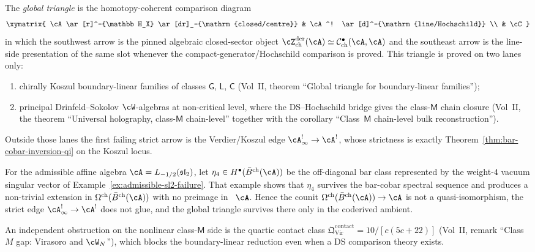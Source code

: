 \begin{remark}
\label{rem:hdm-boundary-linear-vs-global-triangle}
The \emph{global triangle} is the homotopy-coherent comparison diagram
\[
\xymatrix{
\cA \ar[r]^-{\mathbb H_X}
 \ar[dr]_-{\mathrm{closed/centre}}
& \cA^! \ar[d]^-{\mathrm{line/Hochschild}} \\
& \cC
}
\]
in which the southwest arrow is the pinned algebraic closed-sector object
$\cZ^{\mathrm{der}}_{\mathrm{ch}}(\cA)
\simeq \mathcal{C}^{\bullet}_{\mathrm{ch}}(\cA,\cA)$ and the southeast
arrow is the line-side presentation of the same slot whenever the
compact-generator/Hochschild comparison is proved. This triangle is
proved on two lanes only:
\begin{enumerate}[label=\textup{(\roman*)}]
\item chirally Koszul boundary-linear families of classes
 $\mathsf{G}$, $\mathsf{L}$, $\mathsf{C}$
 \textup{(}Vol~II, theorem ``Global triangle for boundary-linear
 families''\textup{)};
\item principal Drinfeld--Sokolov $\cW$-algebras at non-critical level,
 where the DS--Hochschild bridge gives the class-$\mathsf{M}$ chain
 closure
 \textup{(}Vol~II, the theorem ``Universal holography,
 class-$\mathsf{M}$ chain-level'' together with the corollary
 ``Class~$\mathsf{M}$ chain-level bulk reconstruction''\textup{)}.
\end{enumerate}
Outside those lanes the first failing strict arrow is the Verdier/Koszul
edge $\cA^{!}_\infty \to \cA^!$, whose strictness is exactly
Theorem~\ref{thm:bar-cobar-inversion-qi} on the Koszul locus.

For the admissible affine algebra
$\cA = L_{-1/2}(\mathfrak{sl}_2)$, let
$\eta_4 \in H^\bullet(\bar{B}^{\mathrm{ch}}(\cA))$ be the off-diagonal
bar class represented by the weight-$4$ vacuum singular vector of
Example~\ref{ex:admissible-sl2-failure}. That example shows that
$\eta_4$ survives the bar-cobar spectral sequence and produces a
non-trivial extension in
$\Omega^{\mathrm{ch}}(\bar{B}^{\mathrm{ch}}(\cA))$ with no preimage in
~$\cA$. Hence the counit
$\Omega^{\mathrm{ch}}(\bar{B}^{\mathrm{ch}}(\cA)) \to \cA$ is not a
quasi-isomorphism, the strict edge
$\cA^{!}_\infty \to \cA^!$ does not glue, and the global triangle
survives there only in the coderived ambient.

An independent obstruction on the nonlinear class-$\mathsf{M}$ side is
the quartic contact class
$\mathfrak{Q}^{\mathrm{contact}}_{\mathrm{Vir}}
= 10/[c(5c+22)]$
\textup{(}Vol~II, remark ``Class~$M$ gap: Virasoro and
$\cW_N$''\textup{)},
which blocks the boundary-linear reduction even when a DS comparison
theory exists.
\end{remark}

